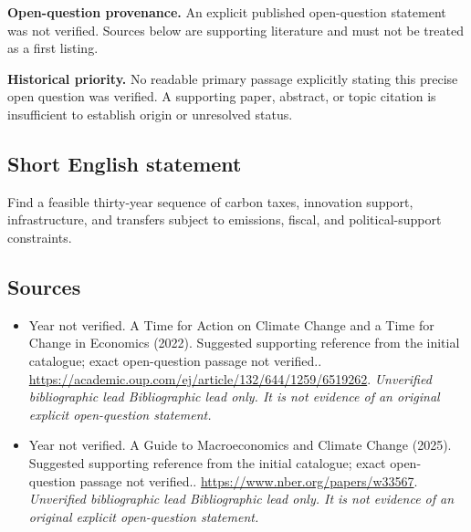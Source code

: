 \documentclass[11pt]{article}
\begin{document}
\par\textbf{Open-question provenance.} An explicit published open-question statement was not verified. Sources below are supporting literature and must not be treated as a first listing.

\par\textbf{Historical priority.} No readable primary passage explicitly stating this precise open question was verified. A supporting paper, abstract, or topic citation is insufficient to establish origin or unresolved status.

\subsection{Short English statement}
Find a feasible thirty-year sequence of carbon taxes, innovation support, infrastructure, and transfers subject to emissions, fiscal, and political-support constraints.

\subsection{Sources}
\begin{itemize}\raggedright
\item[\textnormal{[S1]}]\hypertarget{source:30007721:1}{} Year not verified. A Time for Action on Climate Change and a Time for Change in Economics (2022). Suggested supporting reference from the initial catalogue; exact open-question passage not verified..
\url{https://academic.oup.com/ej/article/132/644/1259/6519262}.
{\small\textit{Unverified bibliographic lead Bibliographic lead only. It is not evidence of an original explicit open-question statement.}}

\item[\textnormal{[S2]}]\hypertarget{source:30007721:2}{} Year not verified. A Guide to Macroeconomics and Climate Change (2025). Suggested supporting reference from the initial catalogue; exact open-question passage not verified..
\url{https://www.nber.org/papers/w33567}.
{\small\textit{Unverified bibliographic lead Bibliographic lead only. It is not evidence of an original explicit open-question statement.}}
\end{itemize}
\end{document}
